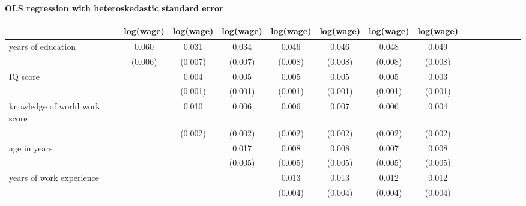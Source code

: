 \begin{center}
\begin{threeparttable}\caption{\textbf{OLS regression with heteroskedastic standard error}}\label{q3tab1}
\begin{tabular}{l*{7}{cc}}
\toprule
                    &\multicolumn{1}{c}{log(wage)}&\multicolumn{1}{c}{log(wage)}&\multicolumn{1}{c}{log(wage)}&\multicolumn{1}{c}{log(wage)}&\multicolumn{1}{c}{log(wage)}&\multicolumn{1}{c}{log(wage)}&\multicolumn{1}{c}{log(wage)}\\
\hline
years of education  &       0.060\sym{***}&       0.031\sym{***}&       0.034\sym{***}&       0.046\sym{***}&       0.046\sym{***}&       0.048\sym{***}&       0.049\sym{***}\\
                    &     (0.006)         &     (0.007)         &     (0.007)         &     (0.008)         &     (0.008)         &     (0.008)         &     (0.008)         \\
IQ score            &                     &       0.004\sym{***}&       0.005\sym{***}&       0.005\sym{***}&       0.005\sym{***}&       0.005\sym{***}&       0.003\sym{***}\\
                    &                     &     (0.001)         &     (0.001)         &     (0.001)         &     (0.001)         &     (0.001)         &     (0.001)         \\
knowledge of world work score&                     &       0.010\sym{***}&       0.006\sym{***}&       0.006\sym{***}&       0.007\sym{***}&       0.006\sym{***}&       0.004\sym{*}  \\
                    &                     &     (0.002)         &     (0.002)         &     (0.002)         &     (0.002)         &     (0.002)         &     (0.002)         \\
age in years        &                     &                     &       0.017\sym{***}&       0.008         &       0.008         &       0.007         &       0.008         \\
                    &                     &                     &     (0.005)         &     (0.005)         &     (0.005)         &     (0.005)         &     (0.005)         \\
years of work experience&                     &                     &                     &       0.013\sym{***}&       0.013\sym{***}&       0.012\sym{***}&       0.012\sym{***}\\
                    &                     &                     &                     &     (0.004)         &     (0.004)         &     (0.004)         &     (0.004)         \\

\end{tabular}
\end{threeparttable}
\end{center}
